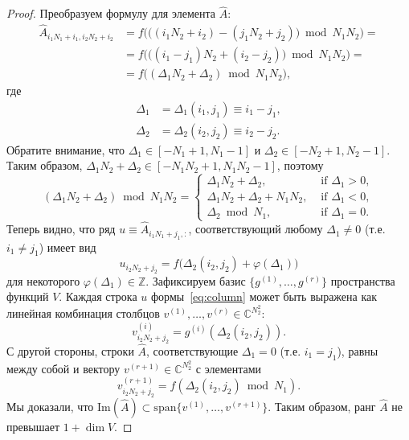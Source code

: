 \begin{proof}
	Преобразуем формулу для элемента $\widehat{A}$:
	\begin{align*}
	\widehat{A}_{i_1N_1 + i_1, i_2N_2 + i_2} &= 
	f\Big(\big((i_1N_2 + i_2) - (j_1N_2 + j_2)\big) \bmod N_1N_2\Big) = \\ &=
	f\Big(\big((i_1-j_1)N_2 + (i_2 - j_2)\big) \bmod N_1N_2\Big) = \\ &=
	f\big((\Delta_1 N_2 + \Delta_2) \bmod N_1N_2\big),
	\end{align*}
	где
	\begin{align*}
	\Delta_1 &= \Delta_1(i_1,j_1) \equiv i_1-j_1, \\
	\Delta_2 &= \Delta_2(i_2,j_2) \equiv i_2-j_2.
	\end{align*}
	Обратите внимание, что $\Delta_1 \in [-N_1+1,N_1-1]$ и $\Delta_2 \in [-N_2+1, N_2 -1]$.
	Таким образом, $\Delta_1N_2 + \Delta_2  \in [-N_1N_2+1, N_1N_2 - 1]$, поэтому
	\[
	(\Delta_1N_2 + \Delta_2) \bmod N_1N_2 =
	\begin{cases}
	\Delta_1N_2 + \Delta_2,          & \text{ if } \Delta_1 > 0, \\
	\Delta_1N_2 + \Delta_2 + N_1N_2, & \text{ if } \Delta_1 < 0, \\
	\Delta_2 \bmod N_1,         & \text{ if } \Delta_1 = 0.
	\end{cases}
	\]
	Теперь видно, что ряд $u \equiv \widehat{A}_{i_1N_1+j_1,:}$, соответствующий любому $\Delta_1 \neq 0$ (т.е. $i_1 \neq j_1$) имеет вид
	\begin{equation}\label{eq:column}
	u_{i_2N_2+j_2} = 
	f\big(\Delta_2(i_2,j_2) + \varphi(\Delta_1)\big)
	\end{equation}
	для некоторого $\varphi(\Delta_1) \in \mathbb{Z}$.
	Зафиксируем базис $\{g^{(1)}, \dots, g^{(r)}\}$ пространства функций $V$.
	Каждая строка $u$ формы~\eqref{eq:column} может быть выражена как линейная комбинация столбцов $v^{(1)}, \dots, v^{(r)} \in \mathbb{C}^{N_2^2}$:
	\[
	v^{(i)}_{i_2N_2+j_2} = 
	g^{(i)}(\Delta_2(i_2,j_2)).
	\]
	С другой стороны, строки $\widehat{A}$, соответствующие $\Delta_1 = 0$ (т.е. $i_1 = j_1$), равны между собой и вектору $v^{(r+1)} \in \mathbb{C}^{N_2^2}$ с элементами
	\[
	v^{(r+1)}_{i_2N_2+j_2} = f(\Delta_2(i_2, j_2) \bmod N_1).
	\]
	Мы доказали, что $\mathrm{Im}(\widehat{A}) \subset \mathrm{span}\{v^{(1)}, \dots, v^{(r+1)}\}$.
	Таким образом, ранг $\widehat{A}$ не превышает $1 + \dim V$.
\end{proof}
